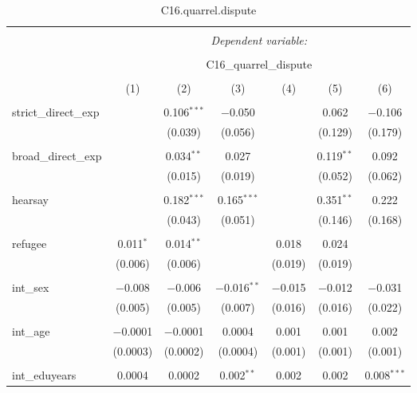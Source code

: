 
\begin{table}[H] \centering 
  \caption{C16.quarrel.dispute} 
  \label{} 
\tiny 
\begin{tabular}{@{\extracolsep{4pt}}lcccccc} 
\\[-1.8ex]\hline 
\hline \\[-1.8ex] 
 & \multicolumn{6}{c}{\textit{Dependent variable:}} \\ 
\cline{2-7} 
\\[-1.8ex] & \multicolumn{6}{c}{C16\_quarrel\_dispute} \\ 
\\[-1.8ex] & (1) & (2) & (3) & (4) & (5) & (6)\\ 
\hline \\[-1.8ex] 
 strict\_direct\_exp &  & 0.106$^{***}$ & $-$0.050 &  & 0.062 & $-$0.106 \\ 
  &  & (0.039) & (0.056) &  & (0.129) & (0.179) \\ 
  & & & & & & \\ 
 broad\_direct\_exp &  & 0.034$^{**}$ & 0.027 &  & 0.119$^{**}$ & 0.092 \\ 
  &  & (0.015) & (0.019) &  & (0.052) & (0.062) \\ 
  & & & & & & \\ 
 hearsay &  & 0.182$^{***}$ & 0.165$^{***}$ &  & 0.351$^{**}$ & 0.222 \\ 
  &  & (0.043) & (0.051) &  & (0.146) & (0.168) \\ 
  & & & & & & \\ 
 refugee & 0.011$^{*}$ & 0.014$^{**}$ &  & 0.018 & 0.024 &  \\ 
  & (0.006) & (0.006) &  & (0.019) & (0.019) &  \\ 
  & & & & & & \\ 
 int\_sex & $-$0.008 & $-$0.006 & $-$0.016$^{**}$ & $-$0.015 & $-$0.012 & $-$0.031 \\ 
  & (0.005) & (0.005) & (0.007) & (0.016) & (0.016) & (0.022) \\ 
  & & & & & & \\ 
 int\_age & $-$0.0001 & $-$0.0001 & 0.0004 & 0.001 & 0.001 & 0.002 \\ 
  & (0.0003) & (0.0002) & (0.0004) & (0.001) & (0.001) & (0.001) \\ 
  & & & & & & \\ 
 int\_eduyears & 0.0004 & 0.0002 & 0.002$^{**}$ & 0.002 & 0.002 & 0.008$^{***}$ \\ 

\end{tabular}
\end{table}
